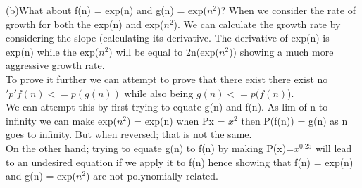 \documentclass[a4paper]{article}
\begin{document}
(b)What about f(n) = exp(n) and g(n) = exp($n^2$)?
When we consider the rate of growth for both the exp(n) and exp($n^2$).  We can calculate the growth rate by considering the slope (calculating its derivative. The derivative of exp(n) is exp(n) while the exp($n^2$) will be equal to 2n(exp($n^2$)) showing a much more aggressive growth rate. \\
To prove it further we can attempt to prove that there exist there exist no $'p' f(n) <= p(g(n))$ while also being $g(n) <= p(f(n)$).\\
We can attempt this by first trying to equate g(n) and f(n).  As lim of n to infinity we can make exp($n^2$) = exp(n) when Px = $x^2$ then P(f(n)) = g(n) as n goes to infinity. But when reversed; that is not the same. \\
On the other hand; trying to equate g(n) to f(n) by making P(x)=$x^{0.25}$ will lead to an undesired equation if we apply it to f(n) hence showing that f(n) = exp(n) and g(n) = exp($n^2$) are not polynomially related.
\end{document}
